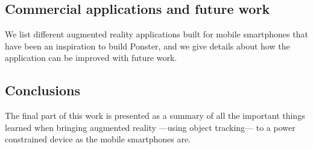 \subsection*{Commercial applications and future work}
We list different augmented reality applications built for mobile smartphones that
have been an inspiration to build Ponster, and we give details about how the
application can be improved with future work.

\subsection*{Conclusions}
The final part of this work is presented as a summary of all the important
things learned when bringing augmented reality ---using object tracking--- to a
power constrained device as the mobile smartphones are.
